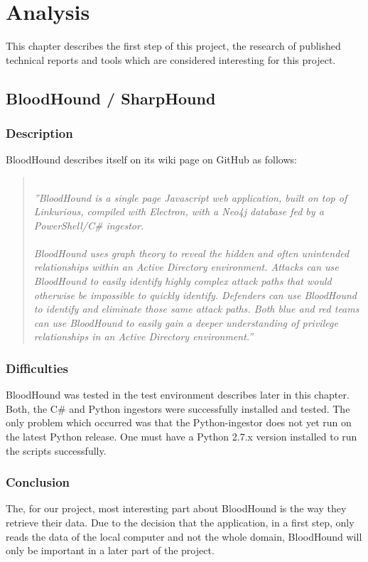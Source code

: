 \section{Analysis}
This chapter describes the first step of this project, the research of published technical reports and tools which are considered interesting for this project.
\subsection{BloodHound / SharpHound}
\subsubsection{Description}
BloodHound describes itself on its wiki page on GitHub as follows:
\begin{quotation} \ \\
\textit{''BloodHound is a single page Javascript web application, built on top of Linkurious, compiled with Electron, with a Neo4j database fed by a PowerShell/C\# ingestor. \\
\ \\
BloodHound uses graph theory to reveal the hidden and often unintended relationships within an Active Directory environment. Attacks can use BloodHound to easily identify highly complex attack paths that would otherwise be impossible to quickly identify. Defenders can use BloodHound to identify and eliminate those same attack paths. Both blue and red teams can use BloodHound to easily gain a deeper understanding of privilege relationships in an Active Directory environment.''} \cite{blo2018}
\end{quotation}
\subsubsection{Difficulties}
BloodHound was tested in the test environment describes later in this chapter. Both, the C\# and Python ingestors were successfully installed and tested. The only problem which occurred was that the Python-ingestor does not yet run on the latest Python release. One must have a Python 2.7.x version installed to run the scripts successfully.

\subsubsection{Conclusion}
The, for our project, most interesting part about BloodHound is the way they retrieve their data. Due to the decision that the application, in a first step, only reads the data of the local computer and not the whole domain, BloodHound will only be important in a later part of the project.

